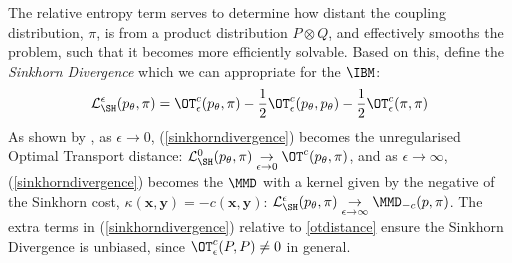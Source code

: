 The relative entropy term serves to determine how distant the coupling distribution, $\pi$, is from a product distribution $P\otimes Q$,  and effectively smooths the problem, such that it becomes more efficiently solvable. Based on this,  define the \textit{Sinkhorn Divergence} which we can appropriate for the $\IBM$:
\begin{align}
    \mathcal{L}_{\SH}^\epsilon(p_\theta, \pi) = \OT^c_\epsilon(p_\theta, \pi) - \frac{1}{2} \OT^c_\epsilon(p_\theta, p_\theta) -\frac{1}{2}\OT^c_\epsilon(\pi, \pi) \label{sinkhorndivergence}
\end{align}
As shown by , as $\epsilon \rightarrow 0$, (\ref{sinkhorndivergence}) becomes the unregularised Optimal Transport distance: $\mathcal{L}_{\SH}^0(p_\theta, \pi)\underset{\epsilon \rightarrow 0}{\rightarrow} \OT^c(p_\theta, \pi)$, and as $\epsilon \rightarrow \infty$, (\ref{sinkhorndivergence}) becomes the $\MMD$ with a kernel given by the negative of the Sinkhorn cost, $\kappa(\mathbf{x}, \mathbf{y}) = -c(\mathbf{x}, \mathbf{y})$: $\mathcal{L}_{\SH}^\epsilon(p_\theta, \pi) \underset{\epsilon \rightarrow \infty}{\rightarrow} \MMD_{-c}(p, \pi)$. The extra terms in (\ref{sinkhorndivergence}) relative to \eqref{otdistance} ensure the Sinkhorn Divergence is unbiased, since $\OT^c_\epsilon(P, P) \neq 0$ in general.

